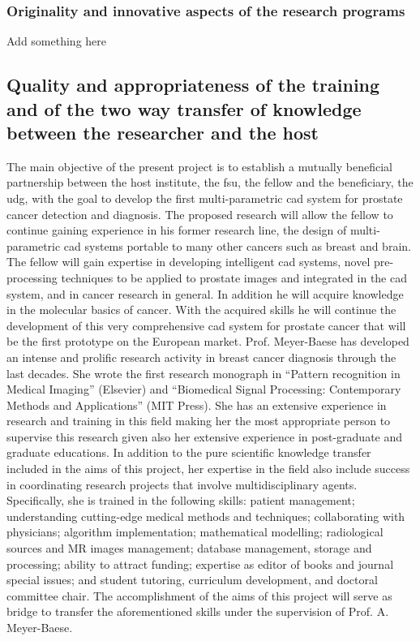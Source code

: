 \subsubsection{Originality and innovative aspects of the research programs}

{\color{red} Add something here}

\subsection{Quality and appropriateness of the training and of the two way transfer of knowledge between the researcher and the host}
\label{sec:transfer}

The main objective of the present project is to establish a mutually beneficial partnership between the host institute, the \ac{fsu}, the fellow and the beneficiary, the \ac{udg}, with the goal to develop the first multi-parametric \ac{cad} system for prostate cancer detection and diagnosis.
The proposed research will allow the fellow to continue gaining experience in his former research line, the design of multi-parametric \ac{cad} systems portable to many other cancers such as breast and brain. The fellow will gain expertise in developing intelligent \ac{cad} systems, novel pre-processing techniques to be applied to prostate images and integrated in the \ac{cad} system, and in cancer research in general. In addition he will acquire knowledge in the molecular basics of cancer. With the acquired skills he will continue the development of this very comprehensive \ac{cad} system for prostate cancer that will be the first prototype on the European market.
Prof. Meyer-Baese has developed an intense and prolific research activity in breast cancer diagnosis through the last decades. She wrote the first research monograph in ``Pattern recognition in Medical Imaging'' (Elsevier) and ``Biomedical Signal Processing: Contemporary Methods and Applications'' (MIT Press). She has an extensive experience in research and training in this field making her the most appropriate person to supervise this research given also her extensive experience in post-graduate and graduate educations. In addition to the pure scientific knowledge transfer included in the aims of this project, her expertise in the field also include success in coordinating research projects that involve multidisciplinary agents. Specifically, she is trained in the following skills: patient management; understanding cutting-edge medical methods and techniques; collaborating with physicians; algorithm implementation; mathematical modelling; radiological sources and MR images management; database management, storage and processing; ability to attract funding; expertise as editor of books and journal special issues; and student tutoring, curriculum development, and doctoral committee chair. The accomplishment of the aims of this project will serve as bridge to transfer the aforementioned skills under the supervision of Prof. A. Meyer-Baese.
